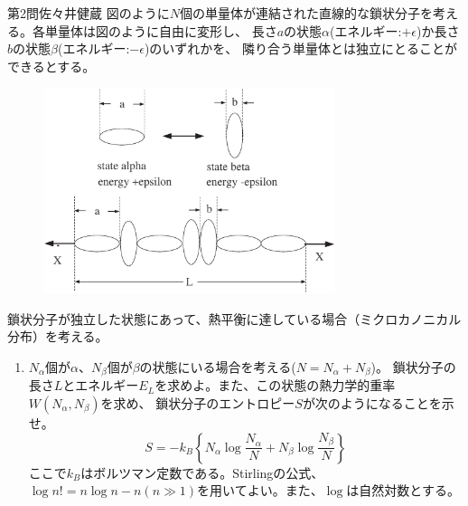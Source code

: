 \documentclass[fleqn]{jbook}
\begin{document}
\begin{question}{第2問}{佐々井健蔵}
図のように$N$個の単量体が連結された直線的な鎖状分子を考える。各単量体は図のように自由に変形し、
長さ$a$の状態$\alpha $(エネルギー:$+\epsilon $)か長さ$b$の状態$\beta $(エネルギー:$-\epsilon $)のいずれかを、
隣り合う単量体とは独立にとることができるとする。
\begin{figure}[htbp]
  \begin{center}
    \includegraphics[keepaspectratio=true,height=60mm]{2003phy2-1.eps}
  \end{center}
  \caption{}%
\end{figure}

鎖状分子が独立した状態にあって、熱平衡に達している場合（ミクロカノニカル分布）を考える。
\begin{enumerate}
\item $N_{\alpha }$個が$\alpha $、$N_{\beta }$個が$\beta $の状態にいる場合を考える($N=N_{\alpha }+N_{\beta }$)。
鎖状分子の長さ$L$とエネルギー$E_{L}$を求めよ。また、この状態の熱力学的重率$W(N_{\alpha },N_{\beta })$を求め、
鎖状分子のエントロピー$S$が次のようになることを示せ。
\begin{equation}
S=-k_B\left\{N_{\alpha }\log \frac{N_{\alpha }}{N}+N_{\beta }\log \frac{N_{\beta }}{N}\right\}
\end{equation}
ここで$k_B$はボルツマン定数である。Stirlingの公式、$\log n!=n\log n-n(n\gg 1)$を用いてよい。また、$\log $は自然対数とする。
\end{enumerate}


\end{question}
\end{document}
